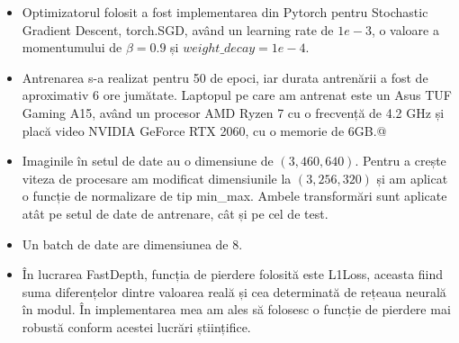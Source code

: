 \documentclass[12pt,a4paper]{report}
\begin{document}
\begin{itemize}
\item Optimizatorul folosit a fost implementarea din Pytorch pentru Stochastic Gradient Descent,
torch.SGD, având un learning rate de $ 1e-3 $, o valoare a momentumului de $ \beta=0.9 $ și
$ weight\_decay=1e-4 $.
\item Antrenarea s-a realizat pentru 50 de epoci, iar durata antrenării a fost de aproximativ
6 ore jumătate. Laptopul pe care am antrenat este un Asus TUF Gaming A15, având un procesor AMD Ryzen 7 cu o frecvență
de 4.2 GHz și placă video NVIDIA GeForce RTX 2060, cu o memorie de 6GB.@
\item Imaginile în setul de date au o dimensiune de $ (3, 460, 640) $. Pentru a crește viteza de procesare
am modificat dimensiunile la $ (3, 256, 320) $ și am aplicat o funcție de normalizare de tip min\_max. Ambele
transformări sunt aplicate atât pe setul de date de antrenare, cât și pe cel de test.
\item Un batch de date are dimensiunea de 8.
\item În lucrarea FastDepth, funcția de pierdere folosită este L1Loss, aceasta fiind suma diferențelor dintre valoarea
reală și cea determinată de rețeaua neurală în modul. În implementarea mea am ales să folosesc o funcție de pierdere
mai robustă conform acestei lucrări științifice\cite{lossfunctionidea}.
\end{itemize}
\end{document}
